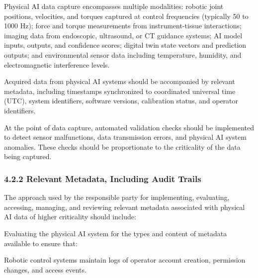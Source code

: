 \begin{description}[leftmargin=2.5cm,style=sameline]

\item[(a)] Physical AI data capture encompasses multiple modalities: robotic joint positions, velocities, and torques captured at control frequencies (typically 50 to 1000 Hz); force and torque measurements from instrument-tissue interactions; imaging data from endoscopic, ultrasound, or CT guidance systems; AI model inputs, outputs, and confidence scores; digital twin state vectors and prediction outputs; and environmental sensor data including temperature, humidity, and electromagnetic interference levels.

\item[(b)] Acquired data from physical AI systems should be accompanied by relevant metadata, including timestamps synchronized to coordinated universal time (UTC), system identifiers, software versions, calibration status, and operator identifiers.

\item[(c)] At the point of data capture, automated validation checks should be implemented to detect sensor malfunctions, data transmission errors, and physical AI system anomalies. These checks should be proportionate to the criticality of the data being captured.

\end{description}

\subsubsection{4.2.2 Relevant Metadata, Including Audit Trails}

The approach used by the responsible party for implementing, evaluating, accessing, managing, and reviewing relevant metadata associated with physical AI data of higher criticality should include:

\begin{description}[leftmargin=2.5cm,style=sameline]

\item[(a)] Evaluating the physical AI system for the types and content of metadata available to ensure that:

\item[(i)] Robotic control systems maintain logs of operator account creation, permission changes, and access events.

\end{description}

